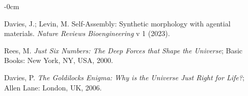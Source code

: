 \documentclass[entropy,article,submit,pdftex,moreauthors]{Definitions/mdpi}
\begin{document}
\begin{adjustwidth}{-\extralength}{0cm}
\begin{thebibliography}{999}
Davies, J.; Levin, M. Self-Assembly: Synthetic morphology with agential materials. \textit{Nature Reviews Bioengineering} v 1 (2023).

Rees, M. \textit{Just Six Numbers: The Deep Forces that Shape the Universe}; Basic Books: New York, NY, USA, 2000.

Davies, P. \textit{The Goldilocks Enigma: Why is the Universe Just Right for Life?}; Allen Lane: London, UK, 2006.


\end{thebibliography}

%


\PublishersNote{}
\end{adjustwidth}
\end{document}
